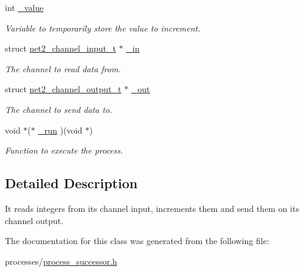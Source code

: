 \begin{DoxyCompactItemize}
\item 
\hypertarget{structprocess__successor__int__t_adab1d50bdaa98b5276673cb49b612fde}{int \hyperlink{structprocess__successor__int__t_adab1d50bdaa98b5276673cb49b612fde}{\-\_\-value}}\label{structprocess__successor__int__t_adab1d50bdaa98b5276673cb49b612fde}

\begin{DoxyCompactList}\small\item\em Variable to temporarily store the value to increment. \end{DoxyCompactList}\item 
\hypertarget{structprocess__successor__int__t_a728f7ed017c840f1fe227adbc7df3c89}{struct \hyperlink{structnet2__channel__input__t}{net2\-\_\-channel\-\_\-input\-\_\-t} $\ast$ \hyperlink{structprocess__successor__int__t_a728f7ed017c840f1fe227adbc7df3c89}{\-\_\-in}}\label{structprocess__successor__int__t_a728f7ed017c840f1fe227adbc7df3c89}

\begin{DoxyCompactList}\small\item\em The channel to read data from. \end{DoxyCompactList}\item 
\hypertarget{structprocess__successor__int__t_aff6997851f624dd26fe8ba56bfae2fd1}{struct \hyperlink{structnet2__channel__output__t}{net2\-\_\-channel\-\_\-output\-\_\-t} $\ast$ \hyperlink{structprocess__successor__int__t_aff6997851f624dd26fe8ba56bfae2fd1}{\-\_\-out}}\label{structprocess__successor__int__t_aff6997851f624dd26fe8ba56bfae2fd1}

\begin{DoxyCompactList}\small\item\em The channel to send data to. \end{DoxyCompactList}\item 
\hypertarget{structprocess__successor__int__t_ad654ff32653fc6c2d59ae2b632f70e28}{void $\ast$($\ast$ \hyperlink{structprocess__successor__int__t_ad654ff32653fc6c2d59ae2b632f70e28}{\-\_\-run} )(void $\ast$)}\label{structprocess__successor__int__t_ad654ff32653fc6c2d59ae2b632f70e28}

\begin{DoxyCompactList}\small\item\em Function to execute the process. \end{DoxyCompactList}\end{DoxyCompactItemize}


\subsection{Detailed Description}
It reads integers from its channel input, increments them and send them on its channel output. 

The documentation for this class was generated from the following file\-:\begin{DoxyCompactItemize}
\item 
processes/\hyperlink{process__successor_8h}{process\-\_\-successor.\-h}\end{DoxyCompactItemize}
